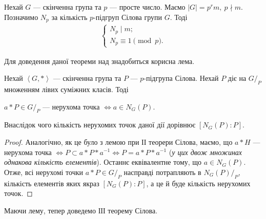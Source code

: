 \documentclass{math_library}
\begin{document}
\begin{theorem}
Нехай $G$ --- скінченна група та $p$ --- просте число. Маємо $|G| = p^r m,\ p \nmid m$. Позначимо $N_p$ за кількість $p$-підгруп Сілова групи $G$. Тоді
\begin{align*}
\begin{cases}
N_p \mid m; \\
N_p \equiv 1 \pmod p.
\end{cases}
\end{align*}
\end{theorem}

Для доведення даної теореми над знадобиться корисна лема.
\begin{lemma}
Нехай $\left< G, *\right>$ --- скінченна група та $P$ --- $p$-підгрупа Сілова. Нехай $P$ діє на $G/_P$ множенням лівих суміжних класів. Тоді
\begin{center}
$a*P \in G/_P$ --- нерухома точка $\iff a \in N_G(P)$.
\end{center}
Внаслідок чого кількість нерухомих точок даної дії дорівнює $[N_G(P):P]$.
\end{lemma}

\begin{proof}
Аналогічно, як це було з лемою при ІІ теорери Сілова, маємо, що $a*H$ --- нерухома точка $\iff P \subset a*P*a^{-1} \iff P = a*P*a^{-1}$ (\textit{у цих двож множинах однакова кількість елементів}). Останнє еквівалентне тому, що $a \in N_G(P)$.\\
Отже, всі нерухомі точки $a*P \in G/_P$ насправді потрапляють в ${N_G(P)}/_P$, кількість елементів яких якраз $[N_G(P):P]$, а це й буде кількість нерухомих точок.
\end{proof}

\iffalse
\begin{proof}
Аналогічно, як це було з ІІ теоремою Сілова, доведемо, що $a*H$ -- нерухома точка $\iff H \subset a*H*a^{-1}$.\\
Останнє еквівалентне тому, що $a \in N_G(H)$ (див. означення нормальних підгруп). А це теж саме, що $a*H \subset N_G(H)$.\\
Нарешті, оскільки $H \triangleleft N_G(H)$, то звідси $[N_G(H):H]$ -- кількість нерухомих точок.
\end{proof}
\fi

Маючи лему, тепер доведемо ІІІ теорему Сілова.
\end{document}
